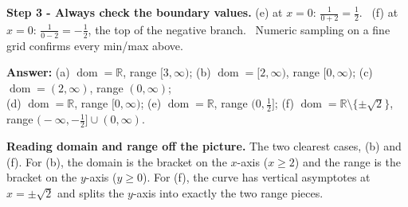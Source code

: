 \documentclass[11pt,a4paper]{article}
\newcommand{\R}{\mathbb{R}}
\newcommand{\dom}{\operatorname{dom}}
\newcommand{\answer}[1]{\begin{answerbox}\centering\textbf{Answer:}\quad #1\end{answerbox}}
\begin{document}
\textbf{Step 3 - Always check the boundary values.}
(e) at $x=0$: $\tfrac1{0+2}=\tfrac12$. \checkmark\ (f) at $x=0$: $\tfrac1{0-2}=-\tfrac12$, the top
of the negative branch. \checkmark\ Numeric sampling on a fine grid confirms every min/max above.

\answer{%
(a) $\dom=\R$, range $[3,\infty)$;\quad
(b) $\dom=[2,\infty)$, range $[0,\infty)$;\quad
(c) $\dom=(2,\infty)$, range $(0,\infty)$;\\[2pt]
(d) $\dom=\R$, range $[0,\infty)$;\quad
(e) $\dom=\R$, range $\bigl(0,\tfrac12\bigr]$;\quad
(f) $\dom=\R\setminus\{\pm\sqrt2\}$, range $\bigl(-\infty,-\tfrac12\bigr]\cup(0,\infty)$.}

\medskip
\textbf{Reading domain and range off the picture.} The two clearest cases, (b) and (f). For (b),
the domain is the bracket on the $x$-axis ($x\ge2$) and the range is the bracket on the $y$-axis
($y\ge0$). For (f), the curve has vertical asymptotes at $x=\pm\sqrt2$ and splits the $y$-axis into
exactly the two range pieces.
\end{document}
